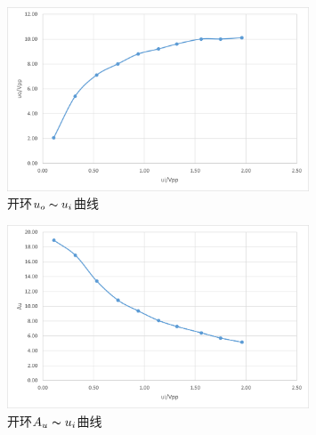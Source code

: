 \documentclass[UTF8]{ctexart}
\begin{document}
\begin{figure}[H]
    \centering
    \includegraphics[width=0.8\textwidth]{pics/41.png}

    \caption{开环$u_o\thicksim u_i$曲线}\label{fig:41}
\end{figure}
\vspace{-1em}
\begin{figure}[H]
    \centering
    \includegraphics[width=0.8\textwidth]{pics/42.png}

    \caption{开环$A_u\thicksim u_i$曲线}\label{fig:42}
\end{figure}
\vspace{-1em}
\end{document}
